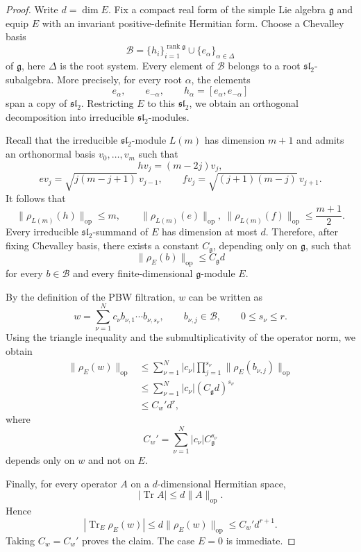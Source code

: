 \documentclass[11pt,a4paper]{amsart}
\numberwithin{equation}{section}
\theoremstyle{definition}
\theoremstyle{remark}
\DeclareMathOperator{\Tr}{Tr}
\begin{document}
\begin{proof}
	Write $d=\dim E$. Fix a compact real form of the simple Lie algebra $\mathfrak g$ and equip $E$ with an invariant positive-definite Hermitian form. Choose a Chevalley basis
	\[
	\mathcal B
	=
	\{h_i\}_{i=1}^{\operatorname{rank}\mathfrak g}
	\cup
	\{e_\alpha\}_{\alpha\in\Delta}
	\]
	of $\mathfrak g$, here $\Delta$ is the root system. Every element of $\mathcal B$ belongs to a root $\mathfrak{sl}_2$-subalgebra.  More precisely, for every root $\alpha$, the elements
	\[
	e_\alpha,\qquad
	e_{-\alpha},\qquad
	h_\alpha=[e_\alpha,e_{-\alpha}]
	\]
	span a copy of $\mathfrak{sl}_2$.  Restricting $E$ to this
	$\mathfrak{sl}_2$, we obtain an orthogonal decomposition into
	irreducible $\mathfrak{sl}_2$-modules.
	
	Recall that the irreducible $\mathfrak{sl}_2$-module $L(m)$ has
	dimension $m+1$ and admits an orthonormal basis
	$v_0,\ldots,v_m$ such that
	\[
	hv_j=(m-2j)v_j,
	\]
	\[
	ev_j=\sqrt{j(m-j+1)}\,v_{j-1},
	\qquad
	fv_j=\sqrt{(j+1)(m-j)}\,v_{j+1}.
	\]
	It follows that
	\[
	\|\rho_{L(m)}(h)\|_{\mathrm{op}}\leq m,
	\qquad
	\|\rho_{L(m)}(e)\|_{\mathrm{op}},
	\ \|\rho_{L(m)}(f)\|_{\mathrm{op}}
	\leq \frac{m+1}{2}.
	\]
	Every irreducible $\mathfrak{sl}_2$-summand of $E$ has dimension at most $d$.  Therefore, after fixing Chevalley basis, there exists a constant $C_{\mathfrak g}$, depending only on $\mathfrak g$, such that
	\[
	\|\rho_E(b)\|_{\mathrm{op}}
	\leq
	C_{\mathfrak g}d
	\]
	for every $b\in\mathcal B$ and every finite-dimensional
	$\mathfrak g$-module $E$.
	
	By the definition of the PBW filtration, $w$ can be written as
	\[
	w
	=
	\sum_{\nu=1}^{N}
	c_\nu
	b_{\nu,1}\cdots b_{\nu,s_\nu},
	\qquad
	b_{\nu,j}\in\mathcal B,
	\qquad
	0\leq s_\nu\leq r.
	\]
	Using the triangle inequality and the submultiplicativity of the
	operator norm, we obtain
	\[
	\begin{aligned}
	\|\rho_E(w)\|_{\mathrm{op}}
	&\leq
	\sum_{\nu=1}^{N}
	|c_\nu|
	\prod_{j=1}^{s_\nu}
	\|\rho_E(b_{\nu,j})\|_{\mathrm{op}}\\
	&\leq
	\sum_{\nu=1}^{N}
	|c_\nu|
	(C_{\mathfrak g}d)^{s_\nu}\\
	&\leq
	C_w' d^r,
	\end{aligned}
	\]
	where
	\[
	C_w'
	=
	\sum_{\nu=1}^{N}
	|c_\nu|C_{\mathfrak g}^{s_\nu}
	\]
	depends only on $w$ and not on $E$.
	
	Finally, for every operator $A$ on a $d$-dimensional Hermitian
	space,
	\[
	|\Tr A|
	\leq
	d\|A\|_{\mathrm{op}}.
	\]
	Hence
	\[
	\left|
	\Tr_E\rho_E(w)
	\right|
	\leq
	d\|\rho_E(w)\|_{\mathrm{op}}
	\leq
	C_w'd^{r+1}.
	\]
	Taking $C_w=C_w'$ proves the claim.  The case $E=0$ is immediate.
\end{proof}
\end{document}
